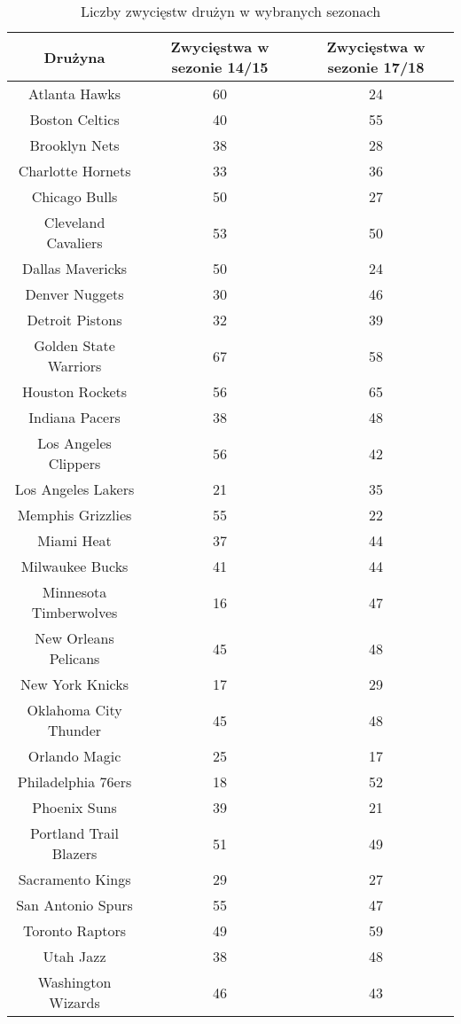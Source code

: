 \documentclass[inzynierska]{pwr_wmat_praca_dyplomowa}
\theoremstyle{plain}
\numberwithin{theorem}{chapter}
\theoremstyle{definition}
\numberwithin{theorem}{chapter}
\begin{document}
\begin{table}[]
	\centering
\begin{tabular}{|c|c|c|}
	\hline
	\textbf{Drużyna}      & \textbf{Zwycięstwa w sezonie 14/15} & \textbf{Zwycięstwa w sezonie 17/18} \\ \hline
	Atlanta Hawks & 60 & 24\\ \hline
	Boston Celtics & 40 & 55\\ \hline
	Brooklyn Nets & 38 & 28\\ \hline
	Charlotte Hornets & 33 & 36\\ \hline
	Chicago Bulls & 50 & 27\\ \hline	
	Cleveland Cavaliers & 53 & 50\\ \hline
	Dallas Mavericks & 50 & 24\\ \hline	
	Denver Nuggets & 30& 46\\ \hline
	Detroit Pistons & 32 & 39\\ \hline
	Golden State Warriors & 67 & 58\\ \hline
	Houston Rockets & 56 & 65 \\\hline
	Indiana Pacers & 38 & 48 \\\hline
	Los Angeles Clippers & 56 & 42\\ \hline
	Los Angeles Lakers & 21 & 35\\ \hline
	Memphis Grizzlies & 55 & 22\\ \hline
	Miami Heat & 37 & 44 \\\hline
	Milwaukee Bucks & 41 & 44\\ \hline
	Minnesota Timberwolves & 16 & 47\\ \hline
	New Orleans Pelicans & 45 & 48\\ \hline
	New York Knicks & 17 & 29\\ \hline
	Oklahoma City Thunder & 45 & 48\\ \hline
	Orlando Magic & 25 & 17\\ \hline
	Philadelphia 76ers & 18 & 52\\ \hline
	Phoenix Suns & 39 & 21 \\\hline
	Portland Trail Blazers & 51 & 49\\ \hline	
	Sacramento Kings & 29 & 27\\ \hline
	San Antonio Spurs & 55 & 47\\ \hline
	Toronto Raptors & 49 & 59\\ \hline
	Utah Jazz & 38 & 48 \\\hline
	Washington Wizards & 46 & 43\\ \hline
\end{tabular}
\caption{Liczby zwycięstw drużyn w wybranych sezonach}\label{tabela_wygrane_rzeczywiste}	
\end{table}
\end{document}

